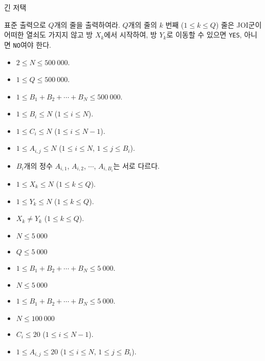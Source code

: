 \begin{problem}{긴 저택}
	
	\OutputFile
	
	표준 출력으로 $Q$개의 줄을 출력하여라. $Q$개의 줄의 $k$ 번째 ($ 1 \le k \le Q$) 줄은 JOI군이 어떠한 열쇠도 가지지 않고 방 $X_k$에서 시작하여, 방 $Y_k$로 이동할 수 있으면 \texttt{YES}, 아니면 \texttt{NO}여야 한다.
	
	\Constraints
	
	\begin{itemize}
		
		\item $2 \le N \le 500\ 000$.
		\item $1 \le Q \le 500\ 000$.
		\item $1 \le B_1 + B_2 + \cdots + B_N \le 500\ 000$.
		\item $1 \le B_i \le N$ ($1 \le i \le N$).
		\item $1 \le C_i \le N$ ($1 \le i \le N-1$).
		\item $1 \le A_{i, j} \le N$ ($1 \le i \le N$, $1 \le j \le B_i$).
		\item $B_i$개의 정수 $A_{i, 1}$, $A_{i, 2}$, $\cdots$, $A_{i, B_i}$는 서로 다르다.

		\item $1 \le X_k \le N$ ($1 \le k \le Q$).
		\item $1 \le Y_k \le N$ ($1 \le k \le Q$).
		\item $X_k \ne Y_k$ ($1 \le k \le Q$).
	\end{itemize}
	
	
	\begin{itemize}
		\item $N \le 5\ 000$
		\item $Q \le 5\ 000$
		\item $1 \le B_1 + B_2 + \cdots + B_N \le 5\ 000$.
	\end{itemize}

	\begin{itemize}
		\item $N \le 5\ 000$
		\item $1 \le B_1 + B_2 + \cdots + B_N \le 5\ 000$.
	\end{itemize}
	
	\begin{itemize}
		\item $N \le 100\ 000$
		\item $C_i \le 20$ ($1 \le i \le N-1$).
		\item $1 \le A_{i, j} \le 20$ ($1 \le i \le N$, $1 \le j \le B_i$).
	\end{itemize}
	

\end{problem}
